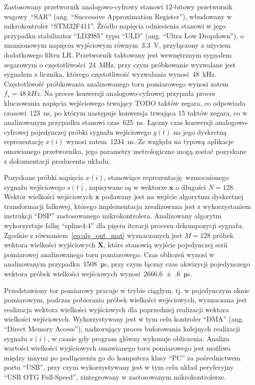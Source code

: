 Zastosowany przetwornik analogowo-cyfrowy stanowi $12$-bitowy przetwornik wagowy~\enquote{SAR} (ang. \enquote{Successive Approximation Register}), wbudowany w mikrokontroler \enquote{STM32F411}. Źródło napięcia odniesienia stanowi w jego przypadku stabilizator \enquote{LD3985} typu \enquote{ULD} (ang. \enquote{Ultra Low Dropdown}), o znamionowym napięciu wyjściowym równym~\qty{3.3}{V}, przyłączony z użyciem dodatkowego filtru LR. Przetwornik taktowany jest wewnętrznym sygnałem zegarowym o częstotliwości~\qty{24}{MHz}, przy czym próbkowanie wyzwalane jest sygnałem z licznika, którego częstotliwość wyzwalania wynosi~\qty{48}{kHz}. Częstotliwość próbkowania analizowanego toru pomiarowego wynosi zatem $f_{s} = \qty{48}{kHz}$. Na proces konwersji analogowo-cyfrowej przypada proces kluczowania napięcia wejściowego trwający TODO taktów zegara, co odpowiada czasowi~\qty{123}{ns}, po którym następuje konwersja trwająca $15$ taktów zegara, co w analizowanym przypadku stanowi czas~\qty{625}{ns}. Łączny czas konwersji analogowo-cyfrowej pojedynczej próbki sygnału wejściowego $y(t)$ na jego dyskretną reprezentację $x(i)$ wynosi zatem~\qty{1234}{ns}. Ze względu na typową aplikacje omawianego przetwornika, jego parametry metrologiczne mogą zostać pozyskane z dokumentacji producenta układu.

Pozyskane próbki napięcia $x(i)$, stanowiące reprezentację wzmocnionego sygnału wejściowego $s(t)$, zapisywane są w wektorze $\mathbf{x}$ o długości $N = 128$. Wektor wielkości wejściowych $\mathbf{x}$ podawany jest na wejście algorytmu dyskretnej transformacji falkowej, którego implementacja zrealizowana jest z wykorzystaniem instrukcji \enquote{DSP} zastosowanego mikrokontrolera. Analizowany algorytm wykorzystuje falkę \enquote{spline4:4} dla pięciu iteracji procesu dekompozycji sygnału. Zgodnie z równaniem~\eqref{eq:alg_out_mat} wyznaczanych jest $M = 128$ próbek wektora wielkości wyjściowych $\mathbf{X}$, które stanowią wyjście pojedynczej serii pomiarowej analizowanego toru pomiarowego. Czas obliczeń wynosi w analizowanym przypadku~\qty{1508}{\micro s}, przy czym łączny czas akwizycji pojedynczego wektora próbek wielkości wejściowych wynosi~\qty{2666.6(6)}{\micro s}.

Przedstawiony tor pomiarowy pracuje w trybie ciągłym, tj. w pojedynczym oknie pomiarowym, podczas pobierania próbek wielkości wejściowych, wyznaczana jest realizacja wektora wielkości wyjściowych dla poprzedniej realizacji wektora wielkości wejściowych. Wykorzystywany jest w tym celu kontroler \enquote{DMA} (ang. \enquote{Direct Memory Access}), nadzorujący proces buforowania kolejnych realizacji sygnału $x(i)$, w czasie gdy program główny wykonuje obliczenia. Analiza wartości wielkości wyjściowych omawianego toru pomiarowego jest możliwa między innymi po podłączeniu go do komputera klasy \enquote{PC} za pośrednictwem portu \enquote{USB}, przy czym wykorzystywany jest w tym celu układ peryferyjny \enquote{USB OTG Full-Speed}, zintegrowany w zastosowanym mikrokontrolerze.

